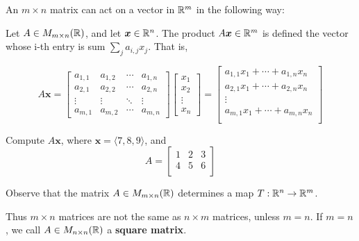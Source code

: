 An $m \times n$ matrix can act on a vector in $\mathbb{R}^m$ in the following way:

\begin{definition}
    
    Let $A \in M_{m \times n}(\mathbb{R})$, and let $\bm{x}\in \mathbb{R}^n$.  The product $A\bm{x} \in \mathbb{R}^m$ is defined the vector whose i-th entry is sum $\sum_j a_{i,j}x_j$. That is, 
    
        \begin{equation*}
A\bm{x} = 
\begin{bmatrix}
a_{1,1} & a_{1,2} & \cdots & a_{1,n} \\
a_{2,1} & a_{2,2} & \cdots & a_{2,n} \\
\vdots  & \vdots  & \ddots & \vdots  \\
a_{m,1} & a_{m,2} & \cdots & a_{m,n} 
\end{bmatrix}
\begin{bmatrix}
x_1 \\
x_2 \\
\vdots   \\
x_n
\end{bmatrix}
= \begin{bmatrix}
a_{1,1}x_1 + \cdots + a_{1,n}x_n\\
a_{2,1}x_1 + \cdots + a_{2,n}x_n\\
\vdots   \\
a_{m,1}x_1 + \cdots + a_{m,n}x_n\\
\end{bmatrix}
\end{equation*}
    
\end{definition}

\begin{example}
    Compute $A\bm{x}$, where $\bm{x} = \langle 7, 8, 9\rangle$, and \begin{equation*}
A = 
\begin{bmatrix}
1 & 2 & 3 \\
4 & 5 & 6 \\
\end{bmatrix}
\end{equation*}
\end{example}

\begin{proposition}
    Observe that the matrix $A\in M_{m \times n}(\mathbb{R})$ determines a map $T: \mathbb{R}^n \to \mathbb{R}^m$.
\end{proposition}

Thus $m \times n$ matrices are not the same as $n \times m$ matrices, unless $m=n$. If $m=n$, we call $A\in M_{n \times n}(\mathbb{R})$ a \textbf{square matrix}.

